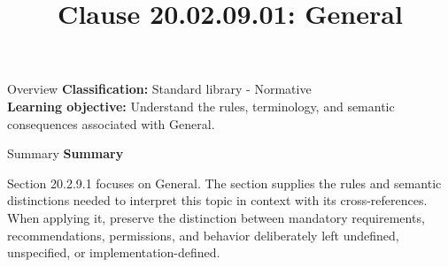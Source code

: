 \documentclass[10pt,letterpaper]{article}
\title{Clause 20.02.09.01: General}
\author{}
\date{}
\begin{document}
\maketitle
\begin{CornellOverviewBox}{Overview}
\textbf{Classification:} Standard library - Normative\\[2pt]
\textbf{Learning objective:} Understand the rules, terminology, and semantic consequences associated with General.
\end{CornellOverviewBox}\begin{CornellSummaryBox}{Summary}
{\sffamily\bfseries\color{Accent} Summary}\par\vspace{3pt}Section 20.2.9.1 focuses on General. The section supplies the rules and semantic distinctions needed to interpret this topic in context with its cross-references. When applying it, preserve the distinction between mandatory requirements, recommendations, permissions, and behavior deliberately left undefined, unspecified, or implementation-defined.
\end{CornellSummaryBox}
\end{document}
